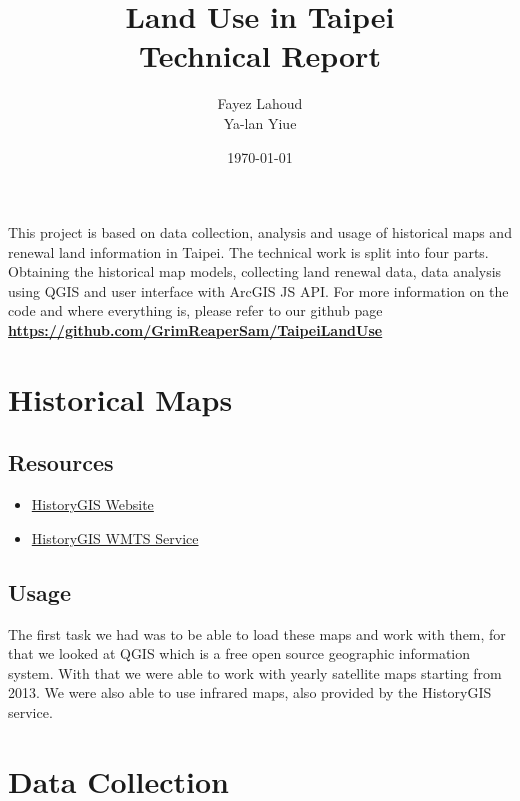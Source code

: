 \documentclass[12pt]{article}
\title{Land Use in Taipei \\
		\large Technical Report}
\author{Fayez Lahoud \\ Ya-lan Yiue}
\date{\today}
\begin{document}
\maketitle

This project is based on data collection, analysis and usage of historical maps and renewal land information in Taipei. The technical work is split into four parts. Obtaining the historical map models, collecting land renewal data, data analysis using QGIS and user interface with ArcGIS JS API. For more information on the code and where everything is, please refer to our github page \textbf{\href{https://github.com/GrimReaperSam/TaipeiLandUse}{https://github.com/GrimReaperSam/TaipeiLandUse}}

\section{Historical Maps}
\subsection{Resources}
\begin{itemize}
\item \href{http://www.historygis.udd.taipei.gov.tw/urban/map/}{HistoryGIS Website}
\item \href{http://www.historygis.udd.gov.taipei/arcgis/rest/services}{HistoryGIS WMTS Service}
\end{itemize}

\subsection{Usage}
The first task we had was to be able to load these maps and work with them, for that we looked at QGIS which is a free open source geographic information system. With that we were able to work with yearly satellite maps starting from 2013. We were also able to use infrared maps, also provided by the HistoryGIS service.

\section{Data Collection}
\end{document}
